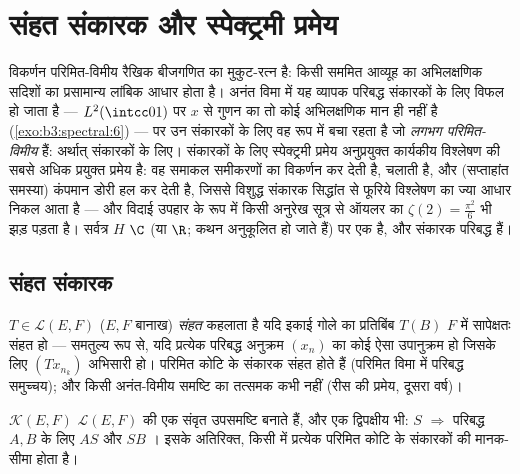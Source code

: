 \chapter{संहत संकारक और स्पेक्ट्रमी प्रमेय}
\label{ch:b3:spectral}

विकर्णन परिमित-विमीय रैखिक बीजगणित का मुकुट-रत्न है: किसी सममित
आव्यूह का अभिलक्षणिक सदिशों का प्रसामान्य लांबिक आधार होता है।
अनंत विमा में यह व्यापक परिबद्ध  संकारकों के लिए विफल हो
जाता है --- $L^2(\intcc01)$ पर $x$ से गुणन का तो कोई अभिलक्षणिक मान ही नहीं
है (\cref{exo:b3:spectral:6}) --- पर उन संकारकों के लिए वह  रूप में बचा रहता है जो
\emph{लगभग परिमित-विमीय} हैं: अर्थात्  संकारकों के लिए। 
 संकारकों के लिए स्पेक्ट्रमी प्रमेय अनुप्रयुक्त कार्यकीय
विश्लेषण की सबसे अधिक प्रयुक्त प्रमेय है: वह समाकल समीकरणों का
विकर्णन कर देती है,  चलाती है, और (सप्ताहांत समस्या)
कंपमान डोरी हल कर देती है, जिससे विशुद्ध संकारक सिद्धांत से फूरिये
विश्लेषण का ज्या आधार निकल आता है --- और विदाई उपहार के रूप में
किसी अनुरेख सूत्र से ऑयलर का $\zeta(2) = \frac{\pi^2}6$ भी झड़ पड़ता है। सर्वत्र $H$
$\C$ (या $\R$; कथन अनुकूलित हो जाते हैं) पर एक  है,
और संकारक परिबद्ध हैं।

\section{संहत संकारक}

\begin{definition}\label{def:b3:spectral:compact}
$T \in \mathcal L(E, F)$ ($E, F$ बानाख) \emph{संहत} कहलाता है यदि
इकाई गोले का प्रतिबिंब $T(B)$ $F$ में सापेक्षतः संहत हो ---
समतुल्य रूप से, यदि प्रत्येक परिबद्ध अनुक्रम $(x_n)$ का कोई ऐसा
उपानुक्रम हो जिसके लिए $(Tx_{n_k})$ अभिसारी हो। परिमित कोटि के संकारक संहत
होते हैं (परिमित विमा में परिबद्ध समुच्चय); और किसी अनंत-विमीय
समष्टि का तत्समक कभी नहीं (रीस की प्रमेय, दूसरा वर्ष)।
\end{definition}

\begin{proposition}\label{prop:b3:spectral:ideal}
 $\mathcal K(E, F)$ $\mathcal L(E, F)$ की एक संवृत उपसमष्टि बनाते हैं, और एक
द्विपक्षीय  भी: $S$  $\Rightarrow$ परिबद्ध $A, B$ के लिए $AS$ और
$SB$ । इसके अतिरिक्त, किसी  में प्रत्येक  परिमित कोटि के संकारकों की मानक-सीमा होता है।
\end{proposition}


